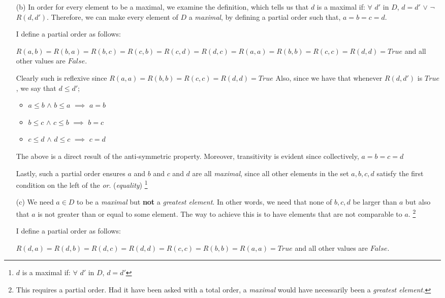 \documentclass[12pt]{article}
\begin{document}
\begin{enumerate}
\newpage

\item[(b)] In order for every element to be a maximal, we examine the definition, which tells us that $d$ is a maximal if: $\forall$ $d'$ in $D$, {\textbf{$d = d'$}} $\lor$ $\neg$$R(d, d')$. Therefore, we can make every element of $D$ a \emph{maximal}, by defining a partial order such that, $a = b = c = d$.

I define a partial order as follows:

$R(a, b) = R(b, a) = R(b, c) = R(c, b) = R(c, d) = R(d, c) = R(a, a) = R(b, b) = R(c, c) = R(d, d) = True$ and all other values are $False$.

Clearly such is reflexive since $R(a, a) = R(b, b) = R(c, c) = R(d, d) = True$
Also, since we have that whenever $R(d, d')$ is $True$, we say that $d \leq d'$;

\begin{itemize}
    \item $a \leq b$ $\land$ $b \leq a$ $\implies$ $a = b$
    \item $b \leq c$ $\land$ $c \leq b$ $\implies$ $b = c$
    \item $c \leq d$ $\land$ $d \leq c$ $\implies$ $c = d$
\end{itemize}

The above is a direct result of the anti-symmetric property.
Moreover, transitivity is evident since collectively, $a = b = c = d$

Lastly, such a partial order ensures $a$ and $b$ and $c$ and $d$ are all \emph{maximal}, since all other elements in the set ${a, b, c, d }$ satisfy the first condition on the left of the \emph{or}. (\emph{equality}) \footnote{$d$ is a maximal if: $\forall$ $d'$ in $D$, {$d = d'$}}


\item[(c)] We need $a \in D$ to be a \emph{maximal} but \textbf{not} a \emph{greatest element}. In other words, we need that none of $b, c, d$ be larger than $a$ but also that $a$ is not greater than or equal to some element. The way to achieve this is to have elements that are not comparable to $a$. \footnote{This requires a partial order. Had it have been asked with a total order, a \emph{maximal} would have necessarily been a \emph{greatest element.}}


I define a partial order as follows:

$R(d, a) = R(d, b) = R(d, c) = R(d, d) = R(c, c) = R(b, b) = R(a, a) = True$ and all other values are $False$.


\end{enumerate}
\end{document}
